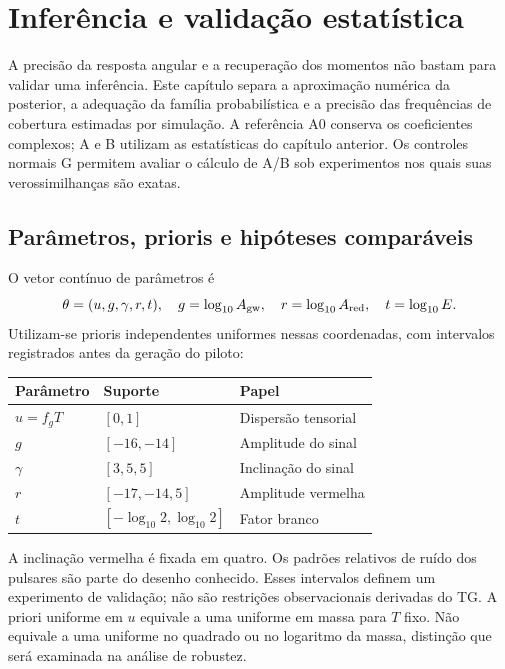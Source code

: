 \chapter{Inferência e validação estatística}
\label{chap:validacao}

A precisão da resposta angular e a recuperação dos momentos não bastam
para validar uma inferência. Este capítulo separa a aproximação numérica
da posterior, a adequação da família probabilística e a precisão das
frequências de cobertura estimadas por simulação. A referência A0 conserva
os coeficientes complexos; A e B utilizam as estatísticas do capítulo
anterior. Os controles normais G permitem avaliar o cálculo de A/B sob
experimentos nos quais suas verossimilhanças são exatas.

\section{Parâmetros, prioris e hipóteses comparáveis}

O vetor contínuo de parâmetros é
\begin{equation}
 \theta=(u,g,\gamma,r,t),\quad
 g=\log_{10}A_{\rm gw},\quad
 r=\log_{10}A_{\rm red},\quad t=\log_{10}E.
 \label{eq:inf-parametros}
\end{equation}
Utilizam-se prioris independentes uniformes nessas coordenadas, com
intervalos registrados antes da geração do piloto:
\begin{center}
\begingroup\small\singlespacing
\begin{tabular}{@{}lll@{}}
\toprule
Parâmetro & Suporte & Papel\\
\midrule
\(u=f_gT\) & \([0,1]\) & Dispersão tensorial\\
\(g\) & \([-16,-14]\) & Amplitude do sinal\\
\(\gamma\) & \([3,5{,}5]\) & Inclinação do sinal\\
\(r\) & \([-17,-14{,}5]\) & Amplitude vermelha\\
\(t\) & \([-\log_{10}2,\log_{10}2]\) & Fator branco\\
\bottomrule
\end{tabular}
\endgroup
\end{center}
A inclinação vermelha é fixada em quatro. Os padrões relativos de ruído
dos pulsares são parte do desenho conhecido. Esses intervalos definem
um experimento de validação; não são restrições observacionais derivadas
do TG. A priori uniforme em \(u\) equivale a uma uniforme em massa para
\(T\) fixo. Não equivale a uma uniforme no quadrado ou no logaritmo da
massa, distinção que será examinada na análise de robustez.

